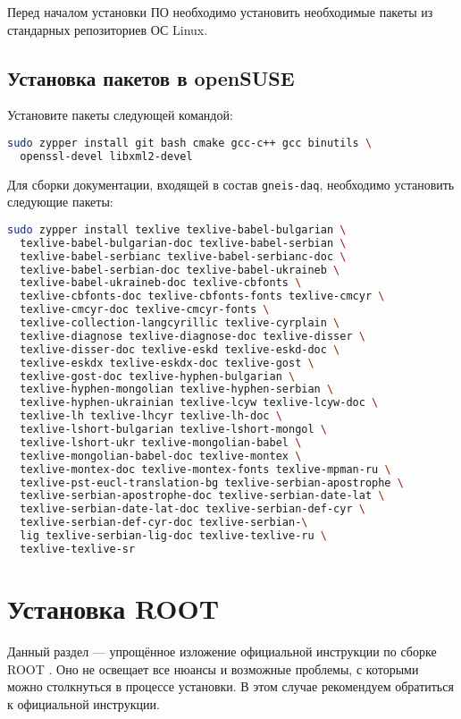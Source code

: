 \documentclass[12pt, a4paper, oneside, onecolumn]{book}
\newcommand{\GD}{{\tt gneis-daq}}
\newcommand{\ROOT}{\mbox{ROOT}}
\begin{document}
Перед началом установки ПО необходимо установить необходимые пакеты из стандарных репозиториев ОС Linux.

\subsection{Установка пакетов в openSUSE}

Установите пакеты следующей командой:

\begin{lstlisting}[language=bash]
sudo zypper install git bash cmake gcc-c++ gcc binutils \
  openssl-devel libxml2-devel
\end{lstlisting}

Для сборки документации, входящей в состав \GD{}, необходимо установить следующие пакеты:

\begin{lstlisting}[language=bash]
sudo zypper install texlive texlive-babel-bulgarian \
  texlive-babel-bulgarian-doc texlive-babel-serbian \
  texlive-babel-serbianc texlive-babel-serbianc-doc \
  texlive-babel-serbian-doc texlive-babel-ukraineb \
  texlive-babel-ukraineb-doc texlive-cbfonts \
  texlive-cbfonts-doc texlive-cbfonts-fonts texlive-cmcyr \
  texlive-cmcyr-doc texlive-cmcyr-fonts \
  texlive-collection-langcyrillic texlive-cyrplain \
  texlive-diagnose texlive-diagnose-doc texlive-disser \
  texlive-disser-doc texlive-eskd texlive-eskd-doc \
  texlive-eskdx texlive-eskdx-doc texlive-gost \
  texlive-gost-doc texlive-hyphen-bulgarian \
  texlive-hyphen-mongolian texlive-hyphen-serbian \
  texlive-hyphen-ukrainian texlive-lcyw texlive-lcyw-doc \
  texlive-lh texlive-lhcyr texlive-lh-doc \
  texlive-lshort-bulgarian texlive-lshort-mongol \
  texlive-lshort-ukr texlive-mongolian-babel \
  texlive-mongolian-babel-doc texlive-montex \
  texlive-montex-doc texlive-montex-fonts texlive-mpman-ru \
  texlive-pst-eucl-translation-bg texlive-serbian-apostrophe \
  texlive-serbian-apostrophe-doc texlive-serbian-date-lat \
  texlive-serbian-date-lat-doc texlive-serbian-def-cyr \
  texlive-serbian-def-cyr-doc texlive-serbian-\
  lig texlive-serbian-lig-doc texlive-texlive-ru \
  texlive-texlive-sr
\end{lstlisting}

\section{Установка \ROOT{}}

Данный раздел --- упрощённое изложение официальной инструкции по сборке \ROOT{} \cite{RootBuild}. Оно не освещает все нюансы и возможные проблемы, с которыми можно столкнуться в процессе установки. В этом случае рекомендуем обратиться к официальной инструкции.
\end{document}
